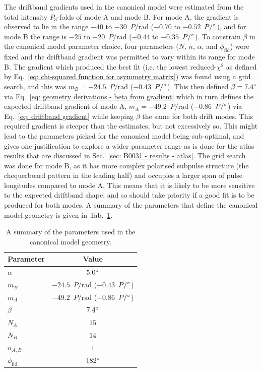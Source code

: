 The driftband gradients used in the canonical model were estimated from the total intensity $P_3$-folds of mode A and mode B. For mode A, the gradient is observed to lie in the range $-40$ to $-30$~$P/\text{rad}$ ($-0.70$ to $-0.52$~$P/^\circ$), and for mode B the range is $-25$ to $-20$~$P/\text{rad}$ ($-0.44$ to $-0.35$~$P/^\circ$). To constrain $\beta$ in the canonical model parameter choice, four parameters ($N$, $n$, $\alpha$, and $\phi_\mathrm{fid}$) were fixed and the driftband gradient was permitted to vary within its range for mode B. The gradient which produced the best fit (i.e. the lowest reduced-$\chi^2$ as defined by Eq.~\ref{eq: chi-squared function for asymmetry matrix}) was found using a grid search, and this was $m_B = -24.5$~$P/\text{rad}$ ($-0.43$~$P/^\circ$). This then defined $\beta = 7.4^\circ$ via Eq.~\eqref{eq: geometry derivations - beta from gradient} which in turn defines the expected driftband gradient of mode A, $m_A = -49.2$~$P/\text{rad}$ ($-0.86$~$P/^\circ$) via Eq.~\eqref{eq: driftband gradient} while keeping $\beta$ the same for both drift modes. This required gradient is steeper than the estimates, but not excessively so. This might lead to the parameters picked for the canonical model being sub-optimal, and gives one justification to explore a wider parameter range as is done for the atlas results that are discussed in Sec.~\ref{sec: B0031 - results - atlas}. The grid search was done for mode B, as it has more complex polarised subpulse structure (the chequerboard pattern in the leading half) and occupies a larger span of pulse longitudes compared to mode A. This means that it is likely to be more sensitive to the expected driftband shape, and so should take priority if a good fit is to be produced for both modes. A summary of the parameters that define the canonical model geometry is given in Tab.~\ref{tab: B0031 - literature parameters}.

\begin{table}
    \centering
    \caption[Parameters of the canonical model]{A summary of the parameters used in the canonical model geometry.}
    \label{tab: B0031 - literature parameters}
    \begin{tabular}{lc}
        \hline
        Parameter & Value \\
        \hline
        $\alpha$            & $5.0^\circ$\\
        $m_B$               & $-24.5$~$P/\text{rad}$ ($-0.43$~$P/^\circ$)\\
        $m_A$               & $-49.2$~$P/\text{rad}$ ($-0.86$~$P/^\circ$)\\
        $\beta$             & $7.4^\circ$\\
        $N_A$               & $15$\\
        $N_B$               & $14$\\
        $n_{A,B}$           & $1$\\
        $\phi_\mathrm{fid}$ & $182^\circ$   
    \end{tabular}
\end{table}


